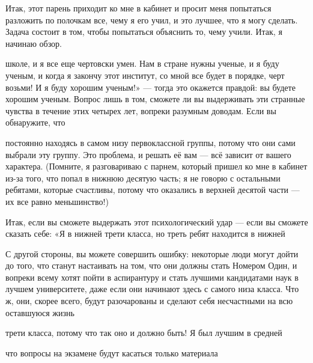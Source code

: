 \documentclass[10pt,oneside]{article}
\newcommand{\TipsSubsection}[1]{\par\vspace{6bp}{\normalsize\bfseries #1\par}\vspace{2bp}}
\begin{document}
\TipsSubsection{1-3 Математика для физики}

Итак, этот парень приходит ко мне в кабинет и просит меня попытаться разложить по полочкам все, чему я его учил, и это лучшее, что я могу сделать. Задача состоит в том, чтобы попытаться объяснить то, чему учили. Итак, я начинаю обзор.\par

школе, и я все еще чертовски умен. Нам в стране нужны ученые, и я буду ученым, и когда я закончу этот институт, со мной все будет в порядке, черт возьми! И я буду хорошим ученым!» --- тогда это окажется правдой: вы будете хорошим ученым. Вопрос лишь в том, сможете ли вы выдерживать эти странные чувства в течение этих четырех лет, вопреки разумным доводам. Если вы обнаружите, что\par

постоянно находясь в самом низу первоклассной группы, потому что они сами выбрали эту группу. Это проблема, и решать её вам --- всё зависит от вашего характера. (Помните, я разговариваю с парнем, который пришел ко мне в кабинет из-за того, что попал в нижнюю десятую часть; я не говорю с остальными ребятами, которые счастливы, потому что оказались в верхней десятой части --- их все равно меньшинство!)\par

Итак, если вы сможете выдержать этот психологический удар --- если вы сможете сказать себе: «Я в нижней трети класса, но треть ребят находится в нижней\par

С другой стороны, вы можете совершить ошибку: некоторые люди могут дойти до того, что станут настаивать на том, что они должны стать Номером Один, и вопреки всему хотят пойти в аспирантуру и стать лучшими кандидатами наук в лучшем университете, даже если они начинают здесь с самого низа класса. Что ж, они, скорее всего, будут разочарованы и сделают себя несчастными на всю оставшуюся жизнь\par

трети класса, потому что так оно и должно быть! Я был лучшим в средней\par

что вопросы на экзамене будут касаться только материала\par
\end{document}
